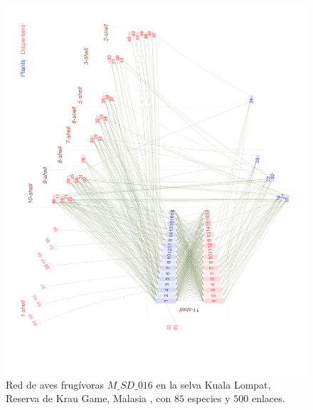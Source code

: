 \clearpage
\begin{figure}[ht!]
\centering
\includegraphics[scale=0.20]{Figures/VIS_M_SD_016_ziggurat.png}
\caption {Red de aves frugívoras $M\_SD\_016$ en la selva Kuala Lompat, Reserva de Krau Game, Malasia \cite{lambert1989fig}, con $85$ especies y $500$ enlaces.}
\label{fig:VIS_M_SD_016_ziggurat}
\end{figure}

